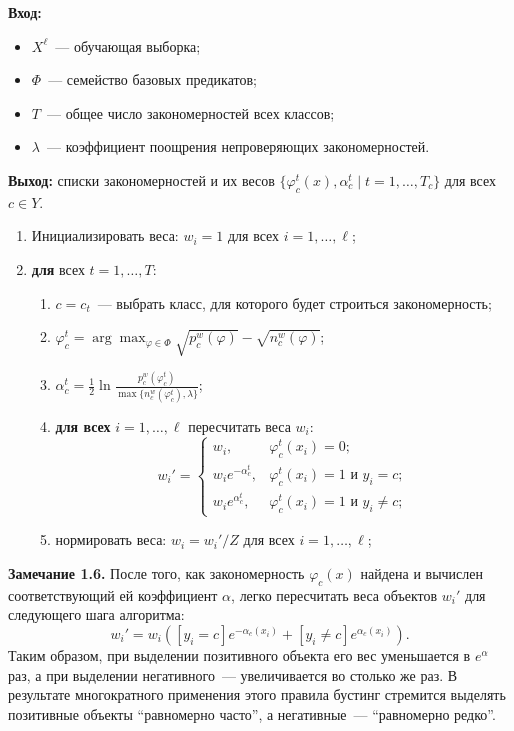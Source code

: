 \textbf{Вход:}
\begin{itemize}
    \item $X^\ell$~--- обучающая выборка;
    \item $\Phi$~--- семейство базовых предикатов;
    \item $T$~--- общее число закономерностей всех классов;
    \item $\lambda$~--- коэффициент поощрения непроверяющих закономерностей.
\end{itemize}

\textbf{Выход:} списки закономерностей и их весов $\{ \varphi_c^t(x), \alpha_c^t \mid t = 1, \ldots, T_c \}$ для всех $c \in Y$.

\begin{enumerate}
    \item Инициализировать веса: $w_i = 1$ для всех $i = 1, \ldots, \ell$;
    \item \textbf{для} всех $t = 1, \ldots, T$:
    \begin{enumerate}
        \item $c = c_t$~--- выбрать класс, для которого будет строиться закономерность;
        \item $\varphi_c^t = \arg\max_{\varphi \in \Phi} \sqrt{p_c^w(\varphi)} - \sqrt{n_c^w(\varphi)}$;
        \item $\alpha_c^t = \frac{1}{2} \ln \frac{p_c^w(\varphi_c^t)}{\max\{n_c^w(\varphi_c^t), \lambda\}}$;
        \item \textbf{для всех} $i = 1, \ldots, \ell$ пересчитать веса $w_i$:
        \[
            w_i' =
            \begin{cases}
                w_i, & \varphi_c^t(x_i) = 0; \\
                w_i e^{-\alpha_c^t}, & \varphi_c^t(x_i) = 1 \text{ и } y_i = c; \\
                w_i e^{\alpha_c^t}, & \varphi_c^t(x_i) = 1 \text{ и } y_i \neq c;
            \end{cases}
        \]
        \item нормировать веса: $w_i = w_i' / Z$ для всех $i = 1, \ldots, \ell$;
    \end{enumerate}
\end{enumerate}

\textbf{Замечание 1.6.} После того, как закономерность $\varphi_c(x)$ найдена и вычислен соответствующий ей коэффициент $\alpha$, легко пересчитать веса объектов $w_i'$ для следующего шага алгоритма:
\[
    w_i' = w_i \left( \left[ y_i = c \right] e^{-\alpha_c(x_i)} + \left[ y_i \neq c \right] e^{\alpha_c(x_i)} \right).
\]
Таким образом, при выделении позитивного объекта его вес уменьшается в $e^\alpha$ раз, а при выделении негативного~--- увеличивается во столько же раз. В результате многократного применения этого правила бустинг стремится выделять позитивные объекты ``равномерно часто'', а негативные~--- ``равномерно редко''.

